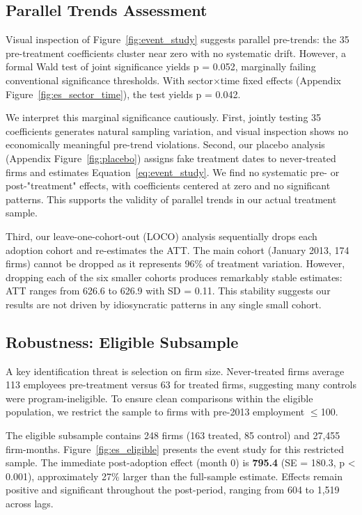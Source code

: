 \documentclass{article}
\begin{document}
\subsection{Parallel Trends Assessment}

Visual inspection of Figure~\ref{fig:event_study} suggests parallel pre-trends: the 35 pre-treatment coefficients cluster near zero with no systematic drift. However, a formal Wald test of joint significance yields p = 0.052, marginally failing conventional significance thresholds. With sector$\times$time fixed effects (Appendix Figure~\ref{fig:es_sector_time}), the test yields p = 0.042.

We interpret this marginal significance cautiously. First, jointly testing 35 coefficients generates natural sampling variation, and visual inspection shows no economically meaningful pre-trend violations. Second, our placebo analysis (Appendix Figure~\ref{fig:placebo}) assigns fake treatment dates to never-treated firms and estimates Equation~\ref{eq:event_study}. We find no systematic pre- or post-"treatment" effects, with coefficients centered at zero and no significant patterns. This supports the validity of parallel trends in our actual treatment sample.

Third, our leave-one-cohort-out (LOCO) analysis sequentially drops each adoption cohort and re-estimates the ATT. The main cohort (January 2013, 174 firms) cannot be dropped as it represents 96\% of treatment variation. However, dropping each of the six smaller cohorts produces remarkably stable estimates: ATT ranges from 626.6 to 626.9 with SD = 0.11. This stability suggests our results are not driven by idiosyncratic patterns in any single small cohort.

\subsection{Robustness: Eligible Subsample}

A key identification threat is selection on firm size. Never-treated firms average 113 employees pre-treatment versus 63 for treated firms, suggesting many controls were program-ineligible. To ensure clean comparisons within the eligible population, we restrict the sample to firms with pre-2013 employment $\leq$100.

The eligible subsample contains 248 firms (163 treated, 85 control) and 27,455 firm-months. Figure~\ref{fig:es_eligible} presents the event study for this restricted sample. The immediate post-adoption effect (month 0) is \textbf{795.4} (SE = 180.3, p < 0.001), approximately 27\% larger than the full-sample estimate. Effects remain positive and significant throughout the post-period, ranging from 604 to 1,519 across lags.
\end{document}
